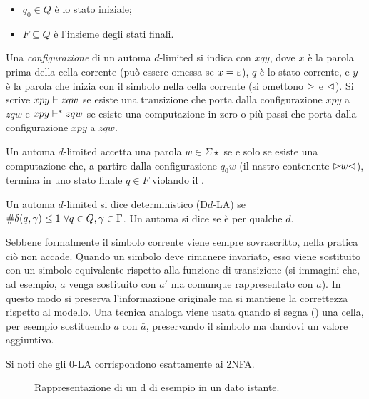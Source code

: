 \begin{defin}
\begin{itemize}
		\item $q_0\in Q$ è lo stato iniziale;
		\item $F\subseteq Q$ è l'insieme degli stati finali.
	\end{itemize}
	Una \emph{configurazione} di un automa $d$-limited si indica con $xqy$, dove $x$ è la parola prima della cella corrente (può essere omessa se $x=\varepsilon$), $q$ è lo stato corrente, e $y$ è la parola che inizia con il simbolo nella cella corrente (si omettono $\rhd$ e $\lhd$). Si scrive $xpy\vdash zqw$ se esiste una transizione che porta dalla configurazione $xpy$ a $zqw$ e $xpy\vdash^* zqw$ se esiste una computazione in zero o più passi che porta dalla configurazione $xpy$ a $zqw$.

	Un automa $d$-limited accetta una parola $w\in\Sigma\star$ se e solo se esiste una computazione che, a partire dalla configurazione $q_0w$ (il nastro contenente $\rhd w\lhd$), termina in uno stato finale $q\in F$ violando il .

	Un automa $d$-limited si dice deterministico (D$d$-LA) se $\# \delta(q,\gamma)\leq 1 ~ \forall q\in Q,\gamma\in\Gamma$. Un automa si dice  se è  per qualche $d$.
\end{defin}
Sebbene formalmente il simbolo corrente viene sempre sovrascritto, nella pratica ciò non accade. Quando un simbolo deve rimanere invariato, esso viene sostituito con un simbolo equivalente rispetto alla funzione di transizione (si immagini che, ad esempio, $a$ venga sostituito con $a'$ ma comunque rappresentato con $a$). In questo modo si preserva l'informazione originale ma si mantiene la correttezza rispetto al modello. Una tecnica analoga viene usata quando si segna () una cella, per esempio sostituendo $a$ con $\bar a$, preservando il simbolo ma dandovi un valore aggiuntivo.

Si noti che gli 0-LA corrispondono esattamente ai 2NFA.

\begin{figure}
	\centering
	
	\caption{Rappresentazione di un \la d di esempio in un dato istante.}
\end{figure}



